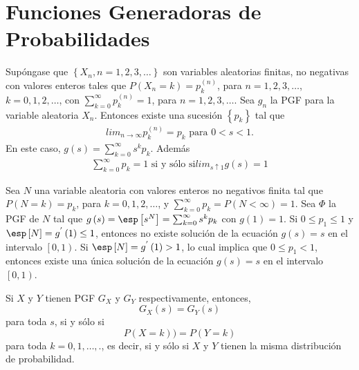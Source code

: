 
%
\section{Funciones Generadoras de Probabilidades}

\begin{Teo}
Sup\'ongase que $\left\{X_{n},n=1,2,3,\ldots\right\}$ son
variables aleatorias finitas, no negativas con valores enteros
tales que $P\left(X_{n}=k\right)=p_{k}^{(n)}$, para
$n=1,2,3,\ldots$, $k=0,1,2,\ldots$, con
$\sum_{k=0}^{\infty}p_{k}^{(n)}=1$, para $n=1,2,3,\ldots$. Sea
$g_{n}$ la PGF para la variable aleatoria $X_{n}$. Entonces existe
una sucesi\'on $\left\{p_{k}\right\}$ tal que
\begin{eqnarray*}
lim_{n\rightarrow\infty}p_{k}^{(n)}=p_{k}\textrm{ para }0<s<1.
\end{eqnarray*}
En este caso, $g\left(s\right)=\sum_{k=0}^{\infty}s^{k}p_{k}$.
Adem\'as
\begin{eqnarray*}
\sum_{k=0}^{\infty}p_{k}=1\textrm{ si y s\'olo si
}lim_{s\uparrow1}g\left(s\right)=1
\end{eqnarray*}
\end{Teo}

\begin{Teo}
Sea $N$ una variable aleatoria con valores enteros no negativos
finita tal que $P\left(N=k\right)=p_{k}$, para $k=0,1,2,\ldots$, y
$\sum_{k=0}^{\infty}p_{k}=P\left(N<\infty\right)=1$. Sea $\Phi$ la
PGF de $N$ tal que
$g\left(s\right)=\esp\left[s^{N}\right]=\sum_{k=0}^{\infty}s^{k}p_{k}$
con $g\left(1\right)=1$. Si $0\leq p_{1}\leq1$ y
$\esp\left[N\right]=g^{'}\left(1\right)\leq1$, entonces no existe
soluci\'on  de la ecuaci\'on $g\left(s\right)=s$ en el intervalo
$\left[0,1\right)$. Si $\esp\left[N\right]=g^{'}\left(1\right)>1$,
lo cual implica que $0\leq p_{1}<1$, entonces existe una \'unica
soluci\'on de la ecuaci\'on $g\left(s\right)=s$ en el intervalo
$\left[0,1\right)$.
\end{Teo}


\begin{Teo}
Si $X$ y $Y$ tienen PGF $G_{X}$ y $G_{Y}$ respectivamente,
entonces,\[G_{X}\left(s\right)=G_{Y}\left(s\right)\] para toda
$s$, si y s\'olo si \[P\left(X=k\right))=P\left(Y=k\right)\] para
toda $k=0,1,\ldots,$., es decir, si y s\'olo si $X$ y $Y$ tienen
la misma distribuci\'on de probabilidad.
\end{Teo}


